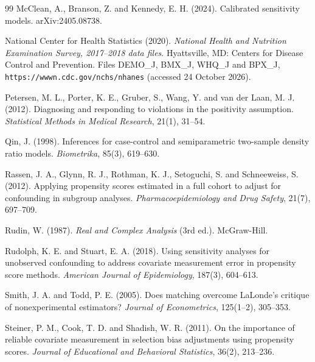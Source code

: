 \documentclass[twoside,11pt]{article}
\theoremstyle{plain}
\theoremstyle{definition}
\begin{document}
\begin{thebibliography}{99}
 McClean, A., Branson, Z. and Kennedy, E. H. (2024). Calibrated sensitivity models. arXiv:2405.08738.

 National Center for Health Statistics (2020). \emph{National Health and Nutrition Examination Survey, 2017--2018 data files}. Hyattsville, MD: Centers for Disease Control and Prevention. Files DEMO\_J, BMX\_J, WHQ\_J and BPX\_J, \texttt{https://wwwn.cdc.gov/nchs/nhanes} (accessed 24 October 2026).

 Petersen, M. L., Porter, K. E., Gruber, S., Wang, Y. and van der Laan, M. J. (2012). Diagnosing and responding to violations in the positivity assumption. \emph{Statistical Methods in Medical Research}, 21(1), 31--54.

 Qin, J. (1998). Inferences for case-control and semiparametric two-sample density ratio models. \emph{Biometrika}, 85(3), 619--630.

 Rassen, J. A., Glynn, R. J., Rothman, K. J., Setoguchi, S. and Schneeweiss, S. (2012). Applying propensity scores estimated in a full cohort to adjust for confounding in subgroup analyses. \emph{Pharmacoepidemiology and Drug Safety}, 21(7), 697--709.

 Rudin, W. (1987). \emph{Real and Complex Analysis} (3rd ed.). McGraw-Hill.

 Rudolph, K. E. and Stuart, E. A. (2018). Using sensitivity analyses for unobserved confounding to address covariate measurement error in propensity score methods. \emph{American Journal of Epidemiology}, 187(3), 604--613.

 Smith, J. A. and Todd, P. E. (2005). Does matching overcome LaLonde's critique of nonexperimental estimators? \emph{Journal of Econometrics}, 125(1--2), 305--353.

 Steiner, P. M., Cook, T. D. and Shadish, W. R. (2011). On the importance of reliable covariate measurement in selection bias adjustments using propensity scores. \emph{Journal of Educational and Behavioral Statistics}, 36(2), 213--236.


\end{thebibliography}
\end{document}
